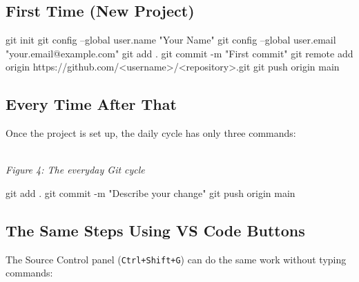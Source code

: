 \documentclass[11pt,a4paper]{article}
\newcommand{\code}[1]{\texttt{#1}}
\newcommand{\figcap}[1]{\\[2pt]{\footnotesize\textit{#1}}}
\begin{document}
\subsection{First Time (New Project)}

\begin{cmd}
git init
git config --global user.name "Your Name"
git config --global user.email "your.email@example.com"
git add .
git commit -m "First commit"
git remote add origin https://github.com/<username>/<repository>.git
git push origin main
\end{cmd}

\subsection{Every Time After That}

Once the project is set up, the daily cycle has only three commands:

\begin{center}
\figcap{Figure 4: The everyday Git cycle}
\end{center}

\begin{cmd}
git add .
git commit -m "Describe your change"
git push origin main
\end{cmd}

\subsection{The Same Steps Using VS Code Buttons}

The Source Control panel (\code{Ctrl+Shift+G}) can do the same work without typing commands:
\end{document}
